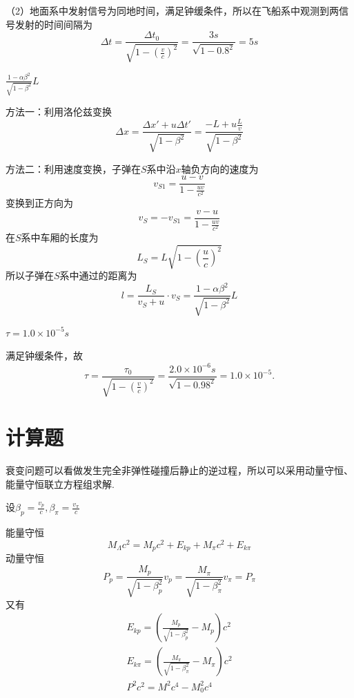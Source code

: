 \documentclass[b5paper,opensource,sourcefont,parskip]{qyxf-book}
\begin{document}
（2）地面系中发射信号为同地时间，满足钟缓条件，所以在飞船系中观测到两信号发射的时间间隔为
\begin{equation*}
\Delta t=\frac{\Delta t_0}{\sqrt{1-(\frac{v}{c})^2}}=\frac{3s}{\sqrt{1-0.8^2}}=5s
\end{equation*}

 $\frac{1-\alpha\beta^2}{\sqrt{1-\beta^2}}L$

\solve
方法一：利用洛伦兹变换
\begin{equation*}
\Delta x=\frac{\Delta x'+u\Delta t'}{\sqrt{1-\beta^2}}=\frac{-L+u\frac{L}{v}}{\sqrt{1-\beta^2}}
\end{equation*}

方法二：利用速度变换，子弹在$S$系中沿$x$轴负方向的速度为
\begin{equation*}
v_{S1}=\frac{u-v}{1-\frac{uv}{c^2}}
\end{equation*}
变换到正方向为
\begin{equation*}
v_S=-v_{S1}=\frac{v-u}{1-\frac{uv}{c^2}}
\end{equation*}
在$S$系中车厢的长度为
\begin{equation*}
L_S=L\sqrt{1-(\frac{u}{c})^2}
\end{equation*}
所以子弹在$S$系中通过的距离为
\begin{equation*}
l=\frac{L_S}{v_S+u}\cdot v_S=\frac{1-\alpha\beta^2}{\sqrt{1-\beta^2}}L
\end{equation*}

$\tau=1.0\times10^{-5}s$

\solve
满足钟缓条件，故
\begin{equation*}
\tau=\frac{\tau_0}{\sqrt{1-(\frac{v}{c})^2}}=\frac{2.0\times10^{-6}s}{\sqrt{1-0.98^2}}=1.0\times10^{-5}.
\end{equation*}


\section{计算题}

\analysis
衰变问题可以看做发生完全非弹性碰撞后静止的逆过程，所以可以采用动量守恒、能量守恒联立方程组求解.

\solve 
设$\beta_p=\frac{v_p}{c},\beta_\pi=\frac{v_\pi}{c}$

能量守恒
\begin{equation*}
M_\Lambda c^2=M_pc^2+E_{kp}+M_\pi c^2+E_{k\pi}
\end{equation*}
动量守恒
\begin{equation*}
P_p=\frac{M_p}{\sqrt{1-\beta_p^2}}v_p=\frac{M_\pi}{\sqrt{1-\beta_\pi^2}}v_\pi=P_\pi
\end{equation*}
又有
\begin{align*}
E_{kp}=(\frac{M_p}{\sqrt{1-\beta_p^2}}-M_p)c^2\\
E_{k\pi}=(\frac{M_\pi}{\sqrt{1-\beta_\pi^2}}-M_\pi)c^2\\
P^2c^2=M^2c^4-M_0^2c^4
\end{align*}
\end{document}
